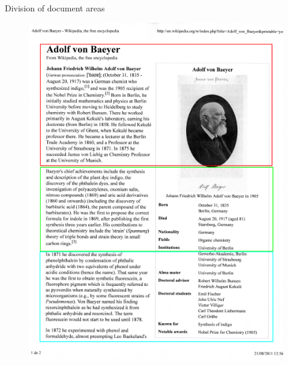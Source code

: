 \documentclass[notes]{beamer}
\begin{document}
\begin{frame}

\begin{block}{Division of document areas}

\begin{figure}[!htb]
\centering
\includegraphics[scale=0.3]{document_areas}
\label{fig:document_areas}
\end{figure}

\end{block}

\end{frame}
\end{document}
